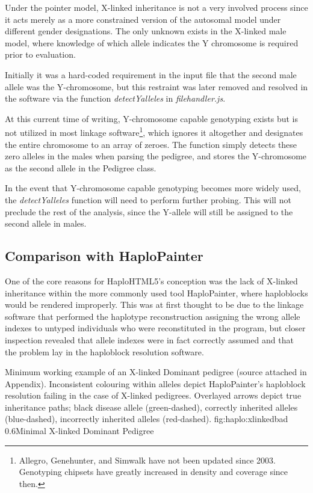 Under the pointer model, X-linked inheritance is not a very involved process since it acts merely as a more constrained version of the autosomal model under different gender designations. The only unknown exists in the X-linked male model, where knowledge of which allele indicates the Y chromosome is required prior to evaluation.

Initially it was a hard-coded requirement in the input file that the second male allele was the Y-chromosome, but this restraint was later removed and resolved in the software via the function \textit{detectYalleles} in \textit{filehandler.js}.

At this current time of writing, Y-chromosome capable genotyping exists but is not utilized in most linkage software\footnote{Allegro, Genehunter, and Simwalk have not been updated since 2003. Genotyping chipsets have greatly increased in density and coverage since then.}, which ignores it altogether and designates the entire chromosome to an array of zeroes. The function simply detects these zero alleles in the males when parsing the pedigree, and stores the Y-chromosome as the second allele in the Pedigree class.

In the event that Y-chromosome capable genotyping becomes more widely used, the \textit{detectYalleles} function will need to perform further probing. This will not preclude the rest of the analysis, since the Y-allele will still be assigned to the second allele in males.

\subsection{Comparison with HaploPainter}

One of the core reasons for HaploHTML5's conception was the lack of X-linked inheritance within the more commonly used tool HaploPainter, where haploblocks would be rendered improperly. This was at first thought to be due to the linkage software that performed the haplotype reconstruction assigning the wrong allele indexes to untyped individuals who were reconstituted in the program, but closer inspection revealed that allele indexes were in fact correctly assumed and that the problem lay in the haploblock resolution software.

	{Minimum working example of an X-linked Dominant pedigree (source attached in Appendix). Inconsistent colouring within alleles depict HaploPainter's haploblock resolution failing in the case of X-linked pedigrees. Overlayed arrows depict true inheritance paths; black disease allele (green-dashed), correctly inherited alleles (blue-dashed), incorrectly inherited alleles (red-dashed).}
	{fig:haplo:xlinkedbad}
	{0.6}{Minimal X-linked Dominant Pedigree}
	
